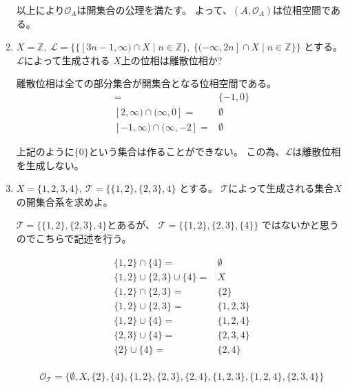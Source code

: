 \documentclass[12pt,b5paper]{ltjsarticle}
\begin{document}
\begin{enumerate}
      以上により$\mathcal{O}_A$は開集合の公理を満たす。
      よって、$(A,\mathcal{O}_A)$は位相空間である。


      \hrulefill

 \item
      $X=\mathbb{Z},\
      \mathcal{L} = \{
        \{ [3n-1,\infty) \cap X \mid n\in\mathbb{Z}\},\
        \{ (-\infty,2n] \cap X \mid n\in\mathbb{Z} \}
      \}$
      とする。
      $\mathcal{L}$によって生成される
      $X$上の位相は離散位相か?

      \dotfill

      離散位相は全ての部分集合が開集合となる位相空間である。
      \begin{align}
       [-1,\infty) \cap (\infty,0] =& \{-1,0\}\\
       [2,\infty) \cap (\infty,0] =& \emptyset\\
       [-1,\infty) \cap (\infty,-2] =& \emptyset
      \end{align}

      上記のように$\{0\}$という集合は作ることができない。
      この為、$\mathcal{L}$は離散位相を生成しない。


      \hrulefill


 \item
      $X=\{1,2,3,4\},\ \mathcal{T}=\{ \{1,2\},\{2,3\},4\}$
      とする。
      $\mathcal{T}$によって生成される集合$X$の開集合系を求めよ。

      \dotfill

      $\mathcal{T}=\{ \{1,2\},\{2,3\},4\}$とあるが、
      $\mathcal{T}=\{ \{1,2\},\{2,3\},\{4\}\}$
      ではないかと思うのでこちらで記述を行う。

      \dotfill

      \begin{align}
       \{1,2\}\cap \{4\} =& \emptyset\\
       \{1,2\}\cup \{2,3\}\cup\{4\} =& X\\
       \{1,2\}\cap \{2,3\} =& \{2\}\\
       \{1,2\}\cup \{2,3\} =& \{1,2,3\}\\
       \{1,2\}\cup \{4\} =& \{1,2,4\}\\
       \{2,3\}\cup \{4\} =& \{2,3,4\}\\
       \{2\}\cup \{4\} =& \{2,4\}\\
      \end{align}

      \begin{equation}
       \mathcal{O}_{\mathcal{T}}
        =\{
        \emptyset,X,
        \{2\},\{4\},
        \{1,2\},\{2,3\},\{2,4\},
        \{1,2,3\},\{1,2,4\},\{2,3,4\}
        \}
      \end{equation}



      \hrulefill

\end{enumerate}
\end{document}
